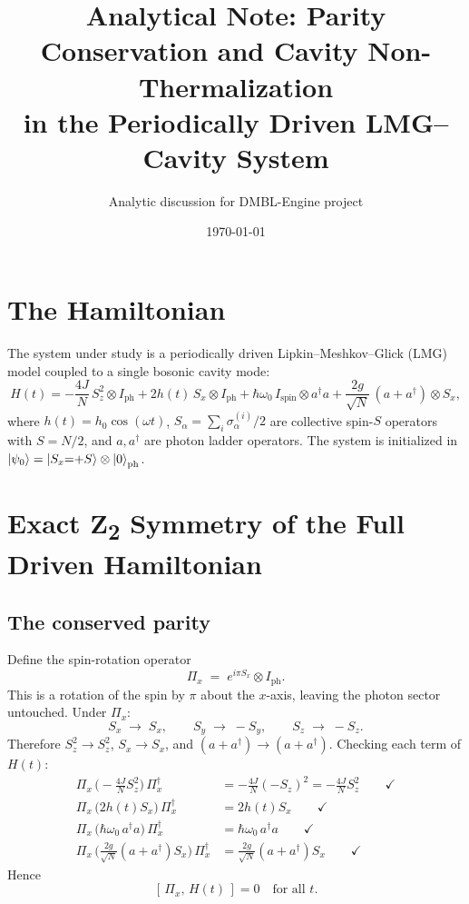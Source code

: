 \documentclass[12pt]{article}
\title{Analytical Note: Parity Conservation and Cavity Non-Thermalization\\
       in the Periodically Driven LMG--Cavity System}
\author{Analytic discussion for DMBL-Engine project}
\date{\today}
\begin{document}
\maketitle

\section{The Hamiltonian}

The system under study is a periodically driven Lipkin--Meshkov--Glick (LMG) model
coupled to a single bosonic cavity mode:
\begin{equation}
  H(t) = -\frac{4J}{N}\,S_z^2 \otimes I_\text{ph}
         + 2h(t)\,S_x \otimes I_\text{ph}
         + \hbar\omega_0\,I_\text{spin} \otimes a^\dagger a
         + \frac{2g}{\sqrt{N}}\,(a+a^\dagger)\otimes S_x ,
  \label{eq:ham}
\end{equation}
where $h(t)=h_0\cos(\omega t)$, $S_\alpha = \sum_i \sigma_\alpha^{(i)}/2$ are
collective spin-$S$ operators with $S=N/2$, and $a,a^\dagger$ are photon
ladder operators.  The system is initialized in
$\ket{\psi_0}=\ket{S_x{=}{+}S}\otimes\ket{0}_\text{ph}$.

\section{Exact Z\textsubscript{2} Symmetry of the Full Driven Hamiltonian}

\subsection{The conserved parity}

Define the spin-rotation operator
\begin{equation}
  \Pi_x \;=\; e^{i\pi S_x}\otimes I_\text{ph} .
\end{equation}
This is a rotation of the spin by $\pi$ about the $x$-axis, leaving the photon
sector untouched.  Under $\Pi_x$:
\begin{equation}
  S_x \;\longrightarrow\; S_x, \qquad
  S_y \;\longrightarrow\; -S_y, \qquad
  S_z \;\longrightarrow\; -S_z .
\end{equation}
Therefore $S_z^2\to S_z^2$, $S_x\to S_x$, and $(a+a^\dagger)\to(a+a^\dagger)$.
Checking each term of $H(t)$:
\begin{align}
  \Pi_x\,\bigl(-\tfrac{4J}{N}S_z^2\bigr)\,\Pi_x^\dagger
    &= -\tfrac{4J}{N}(-S_z)^2 = -\tfrac{4J}{N}S_z^2 \qquad\checkmark \\
  \Pi_x\,\bigl(2h(t)S_x\bigr)\,\Pi_x^\dagger
    &= 2h(t)S_x \qquad\checkmark \\
  \Pi_x\,\bigl(\hbar\omega_0\,a^\dagger a\bigr)\,\Pi_x^\dagger
    &= \hbar\omega_0\,a^\dagger a \qquad\checkmark \\
  \Pi_x\,\bigl(\tfrac{2g}{\sqrt{N}}(a+a^\dagger)S_x\bigr)\,\Pi_x^\dagger
    &= \tfrac{2g}{\sqrt{N}}(a+a^\dagger)S_x \qquad\checkmark
\end{align}
Hence
\begin{equation}
  \boxed{[\,\Pi_x,\,H(t)\,] = 0 \quad\text{for all }t.}
\end{equation}
\end{document}
